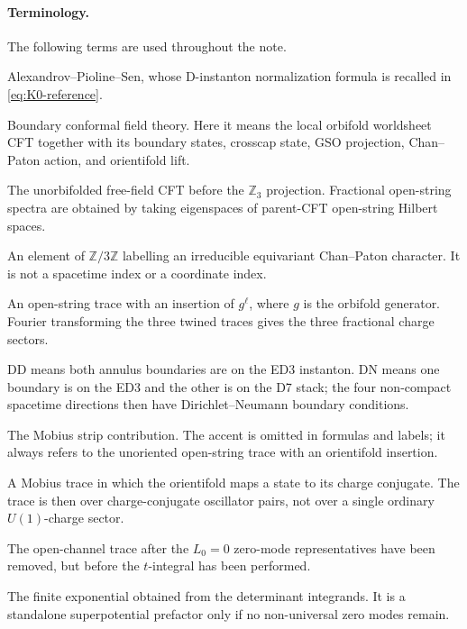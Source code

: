 \documentclass[11pt]{article}
\newcommand{\Z}{\mathbb{Z}}
\newcommand{\DN}{\mathrm{DN}}
\newcommand{\DD}{\mathrm{DD}}
\begin{document}
\paragraph{Terminology.}
The following terms are used throughout the note.
\begin{description}[style=nextline,leftmargin=2.8cm]
\item[APS]
Alexandrov--Pioline--Sen, whose D-instanton normalization formula is recalled in
\eqref{eq:K0-reference}.
\item[BCFT]
Boundary conformal field theory. Here it means the local orbifold worldsheet CFT together with
its boundary states, crosscap state, GSO projection, Chan--Paton action, and orientifold lift.
\item[parent CFT]
The unorbifolded free-field CFT before the \(\Z_3\) projection. Fractional open-string spectra
are obtained by taking eigenspaces of parent-CFT open-string Hilbert spaces.
\item[fractional label or node]
An element of \(\Z/3\Z\) labelling an irreducible equivariant Chan--Paton character. It is not a
spacetime index or a coordinate index.
\item[twined trace]
An open-string trace with an insertion of \(g^\ell\), where \(g\) is the orbifold generator.
Fourier transforming the three twined traces gives the three fractional charge sectors.
\item[DD and DN annuli]
\(\DD\) means both annulus boundaries are on the ED3 instanton. \(\DN\) means one boundary is on
the ED3 and the other is on the D7 stack; the four non-compact spacetime directions then have
Dirichlet--Neumann boundary conditions.
\item[Mobius]
The Mobius strip contribution. The accent is omitted in formulas and labels; it always refers to
the unoriented open-string trace with an orientifold insertion.
\item[folded trace]
A Mobius trace in which the orientifold maps a state to its charge conjugate. The trace is then
over charge-conjugate oscillator pairs, not over a single ordinary \(U(1)\)-charge sector.
\item[determinant integrand]
The open-channel trace after the \(L_0=0\) zero-mode representatives have been removed, but
before the \(t\)-integral has been performed.
\item[determinant factor]
The finite exponential obtained from the determinant integrands. It is a standalone
superpotential prefactor only if no non-universal zero modes remain.
\item[standalone \(K_0\)]

\end{description}
\end{document}
